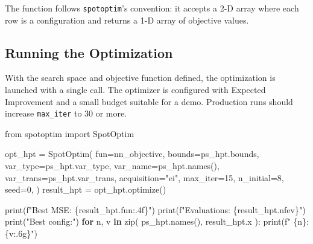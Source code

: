 \documentclass[
  twocolumn]{article}
\newenvironment{Shaded}{\begin{snugshade}}{\end{snugshade}}
\newcommand{\BuiltInTok}[1]{\textcolor[rgb]{0.00,0.23,0.31}{#1}}
\newcommand{\ControlFlowTok}[1]{\textcolor[rgb]{0.00,0.23,0.31}{\textbf{#1}}}
\newcommand{\DecValTok}[1]{\textcolor[rgb]{0.68,0.00,0.00}{#1}}
\newcommand{\ImportTok}[1]{\textcolor[rgb]{0.00,0.46,0.62}{#1}}
\newcommand{\KeywordTok}[1]{\textcolor[rgb]{0.00,0.23,0.31}{\textbf{#1}}}
\newcommand{\NormalTok}[1]{\textcolor[rgb]{0.00,0.23,0.31}{#1}}
\newcommand{\OperatorTok}[1]{\textcolor[rgb]{0.37,0.37,0.37}{#1}}
\newcommand{\SpecialCharTok}[1]{\textcolor[rgb]{0.37,0.37,0.37}{#1}}
\newcommand{\SpecialStringTok}[1]{\textcolor[rgb]{0.13,0.47,0.30}{#1}}
\newcommand{\StringTok}[1]{\textcolor[rgb]{0.13,0.47,0.30}{#1}}
\begin{document}
The function follows \texttt{spotoptim}'s convention: it accepts a 2-D
array where each row is a configuration and returns a 1-D array of
objective values.

\subsection{Running the Optimization}\label{running-the-optimization}

With the search space and objective function defined, the optimization
is launched with a single call. The optimizer is configured with
Expected Improvement and a small budget suitable for a demo. Production
runs should increase \texttt{max\_iter} to 30 or more.

\begin{Shaded}
\begin{Highlighting}[]
\ImportTok{from}\NormalTok{ spotoptim }\ImportTok{import}\NormalTok{ SpotOptim}

\NormalTok{opt\_hpt }\OperatorTok{=}\NormalTok{ SpotOptim(}
\NormalTok{    fun}\OperatorTok{=}\NormalTok{nn\_objective,}
\NormalTok{    bounds}\OperatorTok{=}\NormalTok{ps\_hpt.bounds,}
\NormalTok{    var\_type}\OperatorTok{=}\NormalTok{ps\_hpt.var\_type,}
\NormalTok{    var\_name}\OperatorTok{=}\NormalTok{ps\_hpt.names(),}
\NormalTok{    var\_trans}\OperatorTok{=}\NormalTok{ps\_hpt.var\_trans,}
\NormalTok{    acquisition}\OperatorTok{=}\StringTok{"ei"}\NormalTok{,}
\NormalTok{    max\_iter}\OperatorTok{=}\DecValTok{15}\NormalTok{, n\_initial}\OperatorTok{=}\DecValTok{8}\NormalTok{, seed}\OperatorTok{=}\DecValTok{0}\NormalTok{,}
\NormalTok{)}
\NormalTok{result\_hpt }\OperatorTok{=}\NormalTok{ opt\_hpt.optimize()}

\BuiltInTok{print}\NormalTok{(}\SpecialStringTok{f"Best MSE: }\SpecialCharTok{\{}\NormalTok{result\_hpt}\SpecialCharTok{.}\NormalTok{fun}\SpecialCharTok{:.4f\}}\SpecialStringTok{"}\NormalTok{)}
\BuiltInTok{print}\NormalTok{(}\SpecialStringTok{f"Evaluations: }\SpecialCharTok{\{}\NormalTok{result\_hpt}\SpecialCharTok{.}\NormalTok{nfev}\SpecialCharTok{\}}\SpecialStringTok{"}\NormalTok{)}
\BuiltInTok{print}\NormalTok{(}\StringTok{"Best config:"}\NormalTok{)}
\ControlFlowTok{for}\NormalTok{ n, v }\KeywordTok{in} \BuiltInTok{zip}\NormalTok{(}
\NormalTok{    ps\_hpt.names(), result\_hpt.x}
\NormalTok{):}
    \BuiltInTok{print}\NormalTok{(}\SpecialStringTok{f"  }\SpecialCharTok{\{}\NormalTok{n}\SpecialCharTok{\}}\SpecialStringTok{: }\SpecialCharTok{\{}\NormalTok{v}\SpecialCharTok{:.6g\}}\SpecialStringTok{"}\NormalTok{)}
\end{Highlighting}
\end{Shaded}
\end{document}
